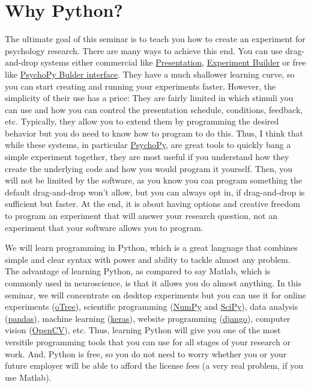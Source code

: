 \documentclass[
]{book}
\begin{document}
\hypertarget{why-python}{%
\section*{Why Python?}\label{why-python}}

The ultimate goal of this seminar is to teach you how to create an experiment for psychology research. There are many ways to achieve this end. You can use drag-and-drop systems either commercial like \href{https://www.neurobs.com/}{Presentation}, \href{https://www.sr-research.com/experiment-builder/}{Experiment Builder} or free like \href{https://psychopy.org/builder}{PsychoPy Bulder interface}. They have a much shallower learning curve, so you can start creating and running your experiments faster. However, the simplicity of their use has a price: They are fairly limited in which stimuli you can use and how you can control the presentation schedule, conditions, feedback, etc. Typically, they allow you to extend them by programming the desired behavior but you do need to know how to program to do this. Thus, I think that while these systems, in particular \href{https://psychopy.org/}{PsychoPy}, are great tools to quickly bang a simple experiment together, they are most useful if you understand how they create the underlying code and how you would program it yourself. Then, you will not be limited by the software, as you know you can program something the default drag-and-drop won't allow, but you can always opt in, if drag-and-drop is sufficient but faster. At the end, it is about having options and creative freedom to program an experiment that will answer your research question, not an experiment that your software allows you to program.

We will learn programming in Python, which is a great language that combines simple and clear syntax with power and ability to tackle almost any problem. The advantage of learning Python, as compared to say Matlab, which is commonly used in neuroscience, is that it allows you do almost anything. In this seminar, we will concentrate on desktop experiments but you can use it for online experiments (\href{https://otree.readthedocs.io/en/latest/}{oTree}), scientific programming (\href{https://numpy.org/}{NumPy} and \href{https://www.scipy.org/}{SciPy}), data analysis (\href{https://pandas.pydata.org/}{pandas}), machine learning (\href{https://keras.io/}{keras}), website programming (\href{https://www.djangoproject.com/}{django}), computer vision (\href{https://opencv.org/}{OpenCV}), etc. Thus, learning Python will give you one of the most versitile programming tools that you can use for all stages of your research or work. And, Python is free, so you do not need to worry whether you or your future employer will be able to afford the license fees (a very real problem, if you use Matlab).
\end{document}
